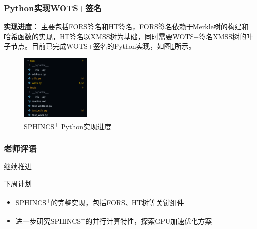 \documentclass{beamer}
\begin{document}
\begin{frame}
  \frametitle{Python实现WOTS+签名}
  \textbf{实现进度：} 主要包括FORS签名和HT签名，FORS签名依赖于Merkle树的构建和哈希函数的实现，HT签名以XMSS树为基础，同时需要WOTS+签名XMSS树的叶子节点。目前已完成WOTS+签名的Python实现，如图\ref{fig:code_py}所示。
  \begin{figure}
    \centering
    \includegraphics[width=0.3\textwidth]{fig/code_py.png}
    \caption{SPHINCS\textsuperscript{+} Python实现进度}
    \label{fig:code_py}
  \end{figure}
\end{frame}

\begin{frame}
  \frametitle{老师评语}
  \begin{alertblock}{继续推进}

  \end{alertblock}
  \begin{block}{下周计划}
    \begin{itemize}
      \item SPHINCS\textsuperscript{+}的完整实现，包括FORS、HT树等关键组件
      \item 进一步研究SPHINCS\textsuperscript{+}的并行计算特性，探索GPU加速优化方案
    \end{itemize}
  \end{block}
\end{frame}

\end{document}
